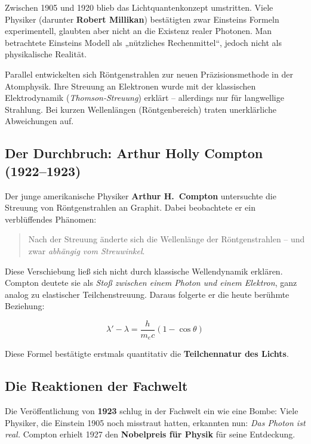 Zwischen 1905 und 1920 blieb das Lichtquantenkonzept umstritten. 
Viele Physiker (darunter \textbf{Robert Millikan}) bestätigten zwar Einsteins Formeln experimentell, glaubten aber nicht an die Existenz realer Photonen.  
Man betrachtete Einsteins Modell als „nützliches Rechenmittel“, jedoch nicht als physikalische Realität.

Parallel entwickelten sich Röntgenstrahlen zur neuen Präzisionsmethode in der Atomphysik.  
Ihre Streuung an Elektronen wurde mit der klassischen Elektrodynamik (\emph{Thomson-Streuung}) erklärt – allerdings nur für langwellige Strahlung.  
Bei kurzen Wellenlängen (Röntgenbereich) traten unerklärliche Abweichungen auf.

\vspace{1em}
\subsection{Der Durchbruch: Arthur Holly Compton (1922–1923)}

Der junge amerikanische Physiker \textbf{Arthur H.~Compton} untersuchte die Streuung von Röntgenstrahlen an Graphit.  
Dabei beobachtete er ein verblüffendes Phänomen:

\begin{quote}
	Nach der Streuung änderte sich die Wellenlänge der Röntgenstrahlen – und zwar \emph{abhängig vom Streuwinkel}.
\end{quote}

Diese Verschiebung ließ sich nicht durch klassische Wellendynamik erklären.  
Compton deutete sie als \emph{Stoß zwischen einem Photon und einem Elektron}, ganz analog zu elastischer Teilchenstreuung.  
Daraus folgerte er die heute berühmte Beziehung:

\[
\lambda' - \lambda = \frac{h}{m_e c}(1 - \cos\theta)
\]

Diese Formel bestätigte erstmals quantitativ die \textbf{Teilchennatur des Lichts}.

\vspace{1em}
\subsection{Die Reaktionen der Fachwelt}

Die Veröffentlichung von \textbf{1923} schlug in der Fachwelt ein wie eine Bombe:  
Viele Physiker, die Einstein 1905 noch misstraut hatten, erkannten nun: \emph{Das Photon ist real.}  
Compton erhielt 1927 den \textbf{Nobelpreis für Physik} für seine Entdeckung.  

